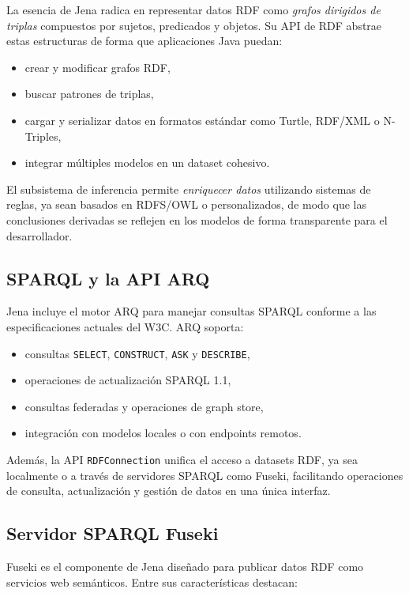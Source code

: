 \documentclass{article}
\begin{document}
La esencia de Jena radica en representar datos RDF como \textit{grafos dirigidos de triplas} compuestos por sujetos, predicados y objetos. Su API de RDF abstrae estas estructuras de forma que aplicaciones Java puedan:

\begin{itemize}
    \item crear y modificar grafos RDF,
    \item buscar patrones de triplas,
    \item cargar y serializar datos en formatos estándar como Turtle, RDF/XML o N-Triples,
    \item integrar múltiples modelos en un dataset cohesivo.
\end{itemize}

El subsistema de inferencia permite \textit{enriquecer datos} utilizando sistemas de reglas, ya sean basados en RDFS/OWL o personalizados, de modo que las conclusiones derivadas se reflejen en los modelos de forma transparente para el desarrollador.

\subsection{SPARQL y la API ARQ}

Jena incluye el motor ARQ para manejar consultas SPARQL conforme a las especificaciones actuales del W3C. ARQ soporta:

\begin{itemize}
    \item consultas \texttt{SELECT}, \texttt{CONSTRUCT}, \texttt{ASK} y \texttt{DESCRIBE},
    \item operaciones de actualización SPARQL 1.1,
    \item consultas federadas y operaciones de graph store,
    \item integración con modelos locales o con endpoints remotos. 
\end{itemize}

Además, la API \texttt{RDFConnection} unifica el acceso a datasets RDF, ya sea localmente o a través de servidores SPARQL como Fuseki, facilitando operaciones de consulta, actualización y gestión de datos en una única interfaz. 

\subsection{Servidor SPARQL Fuseki}

Fuseki es el componente de Jena diseñado para publicar datos RDF como servicios web semánticos. Entre sus características destacan:
\end{document}

